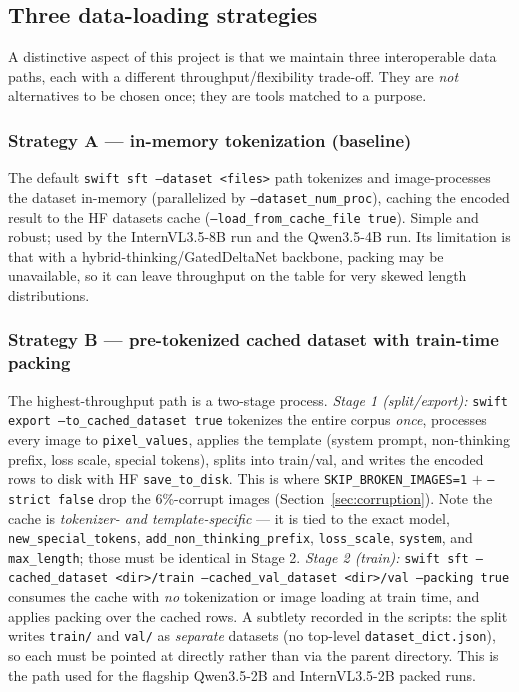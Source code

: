 \documentclass[11pt,a4paper]{article}
\begin{document}
\subsection{Three data-loading strategies}
A distinctive aspect of this project is that we maintain three interoperable data paths, each with a different throughput/flexibility trade-off. They are \emph{not} alternatives to be chosen once; they are tools matched to a purpose.

\subsubsection{Strategy A --- in-memory tokenization (baseline)}
The default \texttt{swift sft --dataset <files>} path tokenizes and image-processes the dataset in-memory (parallelized by \texttt{--dataset\_num\_proc}), caching the encoded result to the HF datasets cache (\texttt{--load\_from\_cache\_file true}). Simple and robust; used by the InternVL3.5-8B run and the Qwen3.5-4B run. Its limitation is that with a hybrid-thinking/GatedDeltaNet backbone, packing may be unavailable, so it can leave throughput on the table for very skewed length distributions.

\subsubsection{Strategy B --- pre-tokenized cached dataset with train-time packing}
The highest-throughput path is a two-stage process. \emph{Stage 1 (split/export):} \texttt{swift export --to\_cached\_dataset true} tokenizes the entire corpus \emph{once}, processes every image to \texttt{pixel\_values}, applies the template (system prompt, non-thinking prefix, loss scale, special tokens), splits into train/val, and writes the encoded rows to disk with HF \texttt{save\_to\_disk}. This is where \texttt{SKIP\_BROKEN\_IMAGES=1} $+$ \texttt{--strict false} drop the 6\%-corrupt images (Section~\ref{sec:corruption}). Note the cache is \emph{tokenizer- and template-specific} --- it is tied to the exact model, \texttt{new\_special\_tokens}, \texttt{add\_non\_thinking\_prefix}, \texttt{loss\_scale}, \texttt{system}, and \texttt{max\_length}; those must be identical in Stage 2. \emph{Stage 2 (train):} \texttt{swift sft --cached\_dataset <dir>/train --cached\_val\_dataset <dir>/val --packing true} consumes the cache with \emph{no} tokenization or image loading at train time, and applies packing over the cached rows. A subtlety recorded in the scripts: the split writes \texttt{train/} and \texttt{val/} as \emph{separate} datasets (no top-level \texttt{dataset\_dict.json}), so each must be pointed at directly rather than via the parent directory. This is the path used for the flagship Qwen3.5-2B and InternVL3.5-2B packed runs.
\end{document}

